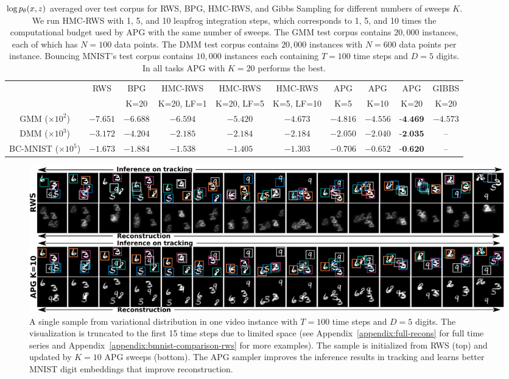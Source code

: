 \documentclass{article}
\theoremstyle{definition}
\begin{document}
\begin{table}[t!]
    \centering
    \caption{$\log p_\theta (x, z)$ averaged over test corpus for RWS, BPG, HMC-RWS, and Gibbs Sampling for different numbers of sweeps $K$.
    We run HMC-RWS with 1, 5, and 10 leapfrog integration steps, which corresponds to 1, 5, and 10 times the computational budget used by APG with the same number of sweeps.
    The GMM test corpus contains $20,000$ instances, each of which has $N=100$ data points. The DMM test corpus contains $20,000$ instances with $N=600$ data points per instance. Bouncing MNIST's test corpus contains $10,000$ instances each containing $T=100$ time steps and $D=5$ digits.
    In all tasks APG with $K=20$ performs the best.}
    \vspace{0.5em}
    \addtolength{\tabcolsep}{-2pt} 
    \begin{tabularx}{\textwidth}{cccccccccc}
    \toprule
     & RWS & BPG & HMC-RWS & HMC-RWS & HMC-RWS & APG & APG & APG & GIBBS \\
     & & K=20 & K=20, LF=1 & K=20, LF=5 & K=5, LF=10 & K=5 & K=10 & K=20 & K=20 \\
    \midrule
    GMM ($\times10^2$)& $-7.651$ & $-6.688$ & $-6.594$ & $-5.420$ & $-4.673$ & $-4.816$ & $-4.556$ & $\textbf{-4.469}$ & $-4.573$ \\
    DMM ($\times10^3$) & $-3.172$ & $-4.204$ & $-2.185$ & $-2.184$ & $-2.184$ & $-2.050$ & $-2.040$ & $\textbf{-2.035}$ & -- \\
    BC-MNIST ($\times10^5$) & $-1.673$ & $-1.884$ & $-1.538$ & $-1.405$ & $-1.303$ & $-0.706$ & $-0.652$ & $\textbf{-0.620}$ & --\\
    \bottomrule
\end{tabularx}
\label{table:log-joint-all}
\end{table}

\begin{figure}[!t]
  \centering
  \includegraphics[width=1.0\textwidth]{figures/bmnist-5digits-samples-with-rws.pdf}
  \vspace{-1.75em}
  \caption{A single sample from variational distribution in one video instance with $T=100$ time steps and $D=5$ digits. The visualization is truncated to the first 15 time steps due to limited space (see Appendix~\ref{appendix:full-recons} for full time series and Appendix~\ref{appendix:bmnist-comparison-rws} for more examples). The sample is initialized from RWS (top) and updated by $K=10$ APG sweeps (bottom). The APG sampler improves the inference results in tracking and learns better MNIST digit embeddings that improve reconstruction.}
  \label{mnist-qualitative}
  \vspace{-0.5em}
\end{figure}
\end{document}
